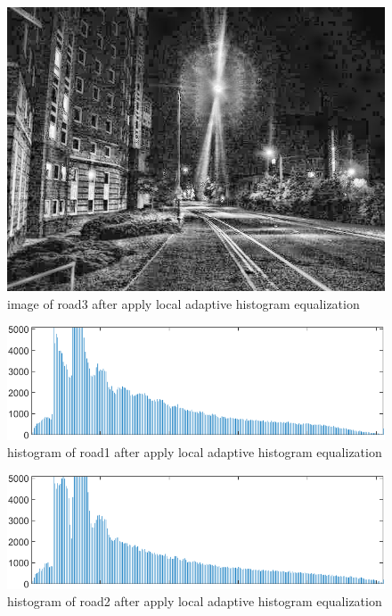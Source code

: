 \documentclass[
	12pt, %
]{fphw}
\begin{document}
\begin{figure}[H]
 
	\centering
	\includegraphics[width=1\columnwidth]{T2/result/I3_local.jpg} 
	\caption{image of road3 after apply local adaptive histogram equalization}
	\label{fig18}
\end{figure}
\begin{figure}[H]
 
	\centering
	\includegraphics[width=1\columnwidth]{T2/result/hist1_local.png} 
	\caption{histogram of road1 after apply local adaptive histogram equalization}
	\label{fig19}
\end{figure}
\begin{figure}[H]
 
	\centering
	\includegraphics[width=1\columnwidth]{T2/result/hist2_local.png} 
	\caption{histogram of road2 after apply local adaptive histogram equalization}
	\label{fig20}
\end{figure}
\end{document}
